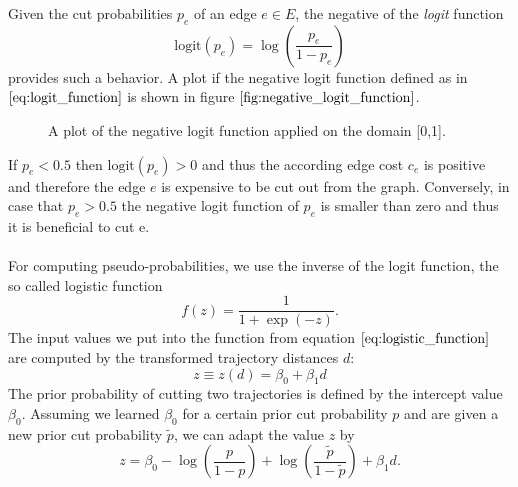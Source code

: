 Given the cut probabilities $p_e$ of an edge $e \in E$, the negative of the \textit{logit} function 
\begin{equation}
	\text{logit}\left( p_e \right) = \log \left( \frac{p_e}{1 - p_e} \right)
	\label{eq:logit_function}
\end{equation}
provides such a behavior. A plot if the negative logit function defined as in $\ref{eq:logit_function}$ is shown in figure $\ref{fig:negative_logit_function}$.
\begin{figure}
\centering
{}
\caption[Logit Function Plot]{A plot of the negative logit function applied on the domain [0,1].}
\label{fig:negative_logit_function}
\end{figure}
If $p_e < 0.5$ then $\text{logit}\left( p_e \right) > 0$ and thus the according edge cost $c_e$ is positive and therefore the edge $e$ is expensive to be cut out from the graph. Conversely, in case that $p_e > 0.5$ the negative logit function of $p_e$ is smaller than zero and thus it is beneficial to cut e. \\ \\
For computing pseudo-probabilities, we use the inverse of the logit function, the so called logistic function
\begin{equation}
	f(z) = \frac{1}{1 + \exp \left( -z \right)}.
	\label{eq:logistic_function}
\end{equation}
The input values we put into the function from equation $\ref{eq:logistic_function}$ are computed by the transformed trajectory distances $d$:
\begin{equation}
	z \equiv z(d) = \beta_0 + \beta_1 d
\end{equation}
The prior probability of cutting two trajectories is defined by the intercept value $\beta_0$. Assuming we learned $\beta_0$ for a certain prior cut probability $p$ and are given a new prior cut probability $\tilde{p}$, we can adapt the value $z$ by
\begin{equation}
	z = \beta_0 - \log \left( \frac{p}{1-p} \right) + \log \left( \frac{\tilde{p}}{1-\tilde{p}} \right) + \beta_1 d.
\end{equation}
